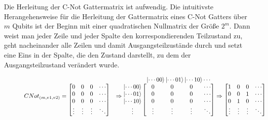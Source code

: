 \documentclass[12pt]{report}
\begin{document}
Die Herleitung der C-Not Gattermatrix ist aufwendig. Die intuitivste Herangehensweise für die Herleitung der Gattermatrix eines C-Not Gatters über $m$ Qubits ist der Beginn mit einer quadratischen Nullmatrix der Größe $2^m$. Dann weist man jeder Zeile und jeder Spalte den korrespondierenden Teilzustand zu, geht nacheinander alle Zeilen und damit Ausgangsteilzustände durch und setzt eine Eins in der Spalte, die den Zustand darstellt, zu dem der Ausgangsteilzustand verändert wurde.
\begin{figure}[h]
\begin{alignat*}{4}
CNot_{(m,v1,v2)} &= \begin{matrix}\\\begin{bmatrix} 0&0&0&\cdots \\ 0&0&0&\cdots \\ 0&0&0&\cdots \\ \vdots&\vdots&\vdots&\ddots \end{bmatrix}\end{matrix}
&\Rightarrow \begin{matrix}
	& \ket{\cdots 00} \ket{\cdots 01} \ket{\cdots 10} \cdots \\
	\begin{matrix} \ket{\cdots 00} \\ \ket{\cdots 01} \\ \ket{\cdots 10} \\ \vdots \end{matrix} \hspace{-3mm}
	& \begin{bmatrix} \hspace{3mm}0\hspace{3mm}&\hspace{3mm}0\hspace{3mm}&\hspace{3mm}0\hspace{3mm}&\cdots \\ 0&0&0&\cdots \\ 0&0&0&\cdots \\ \vdots&\vdots&\vdots&\ddots \end{bmatrix}\end{matrix}
	&\Rightarrow \begin{matrix}\\\begin{bmatrix} 1&0&0&\cdots \\ 0&0&1&\cdots \\ 0&1&0&\cdots \\ \vdots&\vdots&\vdots&\ddots \end{bmatrix}\end{matrix}
\end{alignat*}
\end{figure}
\end{document}
